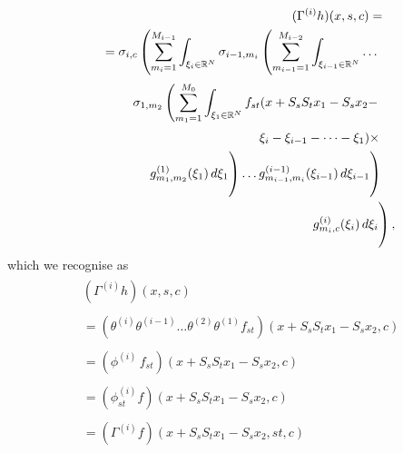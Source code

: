 \documentclass[twocolumn,runningheads]{svjour3}
\def\bbbr{{\mathbb R}}
\begin{document}
\begin{align}
\begin{split}
&  (\Gamma^{(i)} h)(x, s, c) =  
\end{split}\nonumber\\
\begin{split}
& = 
\sigma_{i,c} 
\left(
\sum_{m_i=1}^{M_{i-1}}
\int_{\xi_i \in \bbbr^N} 
\sigma_{i-1,m_i}
\left(
\sum_{m_{i-1}=1}^{M_{i-2}}
\int_{\xi_{i-1} \in \bbbr^N} 
\dots
\right.
\right.
\end{split}\nonumber\\
\begin{split}
& \phantom{\sigma_i \vphantom{\left( \sum_{m_i=1}^{M_{i-1}} \right.)}} \quad
\left.
\left.
\sigma_{1,m_2}
\left(
\sum_{m_1=1}^{M_0}
\int_{\xi_1 \in \bbbr^N} 
f_{st}(x + S_s S_t x_1 - S_s x_2  -
\right.
\right.
\right.
\end{split}\nonumber\\
\begin{split}
& \hphantom{\sigma_i \vphantom{\left( \sum_{m_i=1}^{M_{i-1}} \right.)}} \quad
\left.
\left.
\hphantom{\sigma_{1,m_2} \left(  \sum_{m_1=1}^{M_0}
	\int_{\xi_1 \in \bbbr^N} \right. } \quad\quad
\xi_i - \xi_{i-1} - \dots - \xi_1) \times
\right.
\right.
\end{split}\nonumber\\
\begin{split}
& \phantom{\sigma_i \vphantom{\left( \sum_{m_i=1}^{M_{i-1}} \right.)}} \quad
\left.
\left.
\left.
\phantom{\left(\sum_{m_i=1}^{M_{i-1}} \right.)}
g_{m_1,m_2}^{(1)}(\xi_1)  \, d\xi_1
\right) \dots
g_{m_{i-1},m_i}^{(i-1)}(\xi_{i-1})  \, d\xi_{i-1}
\vphantom{\left( \sum_{m_i=1}^{M_{i-1}} \right.)} 
\right)
\right.
\end{split}\nonumber\\
\begin{split}
\left.
\vphantom{\left(\sum_{m_i=1}^{M_{i-1}} \right.)}\quad\quad
g_{m_i,c}^{(i)}(\xi_i)  \, d\xi_i
\vphantom{\left( \sum_{m_i=1}^{M_{i-1}} \right.)} \right),
\end{split} 
\end{align}
which we recognise as
\begin{align}
\begin{split}
&  (\Gamma^{(i)} h)(x, s, c) 
\end{split}\nonumber\\
\begin{split}
& = (\theta^{(i)} \theta^{(i-1)} \dots \theta^{(2)} \theta^{(1)} f_{st})(x + S_s S_t x_1 - S_s x_2, c) 
\end{split}\nonumber\\
\begin{split}
& = (\phi^{(i)} \, f_{st})(x + S_s S_t x_1 - S_s x_2, c) 
\end{split}\nonumber\\
\begin{split}
&  = (\phi_{st}^{(i)} f)(x + S_s S_t x_1 - S_s x_2, c) 
\end{split}\nonumber\\
\begin{split}
&=  (\Gamma^{(i)} f)(x + S_s S_t x_1 - S_s x_2, st, c)
\end{split}
\end{align}
\end{document}
